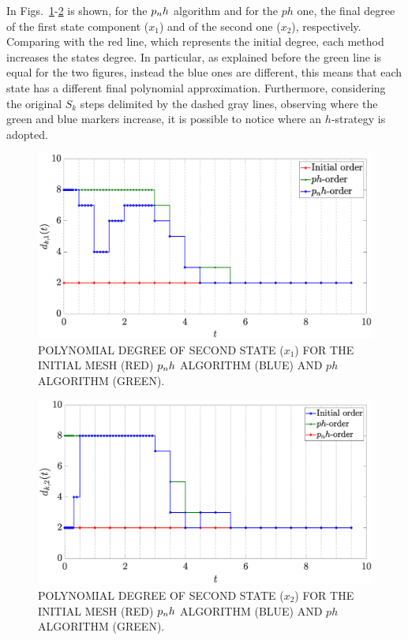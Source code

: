 In Figs.~\ref{fig:pnh1vanderpol}-\ref{fig:pnh2vanderpol} is shown, for the $p_{n}h$ algorithm and for the $ph$ one, the final degree of the first state component ($x_1$) and of the second one ($x_2$), respectively. Comparing with the red line, which represents the initial degree, each method increases the states degree. In particular, as explained before the green line is equal for the two figures, instead the blue ones are different, this means that each state has a different final polynomial approximation. Furthermore, considering the original $S_k$ steps delimited by the dashed gray lines, observing where the green and blue markers increase, it is possible to notice where an $h$-strategy is adopted.
\begin{figure}
	\centering
	\includegraphics[trim={2cm 0cm 4cm 0cm},clip,width=1.\linewidth]{Img/pnh1_vanderpol}
	\caption{POLYNOMIAL DEGREE OF SECOND STATE ($x_{1}$) FOR THE INITIAL MESH (RED) $p_{n}h$ ALGORITHM (BLUE) AND $ph$ ALGORITHM (GREEN).}
	\label{fig:pnh1vanderpol}
\end{figure}

\begin{figure}
	\centering
	\includegraphics[trim={2cm 0cm 4cm 0cm},clip,width=1.\linewidth]{Img/pnh2_vanderpol}
	\caption{POLYNOMIAL DEGREE OF SECOND STATE ($x_{2}$) FOR THE INITIAL MESH (RED) $p_{n}h$ ALGORITHM (BLUE) AND $ph$ ALGORITHM (GREEN).}
	\label{fig:pnh2vanderpol}
\end{figure}

